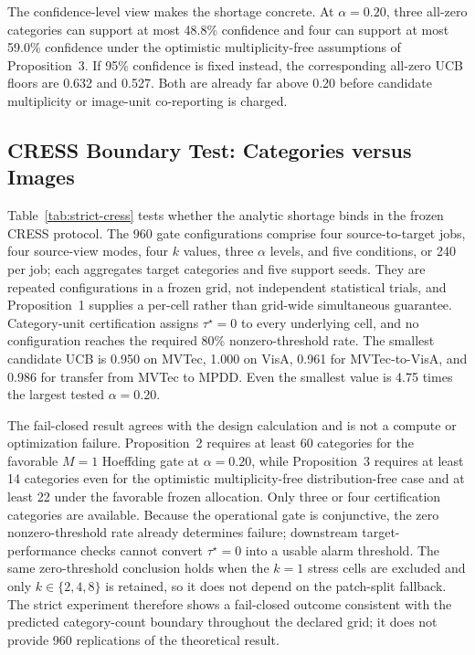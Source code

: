 The confidence-level view makes the shortage concrete. At $\alpha=0.20$, three all-zero categories can support at most 48.8\% confidence and four can support at most 59.0\% confidence under the optimistic multiplicity-free assumptions of Proposition~3. If 95\% confidence is fixed instead, the corresponding all-zero UCB floors are 0.632 and 0.527. Both are already far above 0.20 before candidate multiplicity or image-unit co-reporting is charged.

\subsection{CRESS Boundary Test: Categories versus Images}\label{sec:cress-strict-results}



Table~\ref{tab:strict-cress} tests whether the analytic shortage binds in the frozen CRESS protocol. The 960 gate configurations comprise four source-to-target jobs, four source-view modes, four $k$ values, three $\alpha$ levels, and five conditions, or 240 per job; each aggregates target categories and five support seeds. They are repeated configurations in a frozen grid, not independent statistical trials, and Proposition~1 supplies a per-cell rather than grid-wide simultaneous guarantee. Category-unit certification assigns $\tau^\star=0$ to every underlying cell, and no configuration reaches the required 80\% nonzero-threshold rate. The smallest candidate UCB is 0.950 on MVTec, 1.000 on VisA, 0.961 for MVTec-to-VisA, and 0.986 for transfer from MVTec to MPDD\@. Even the smallest value is 4.75 times the largest tested $\alpha=0.20$.

The fail-closed result agrees with the design calculation and is not a compute or optimization failure. Proposition~2 requires at least 60 categories for the favorable $M=1$ Hoeffding gate at $\alpha=0.20$, while Proposition~3 requires at least 14 categories even for the optimistic multiplicity-free distribution-free case and at least 22 under the favorable frozen allocation. Only three or four certification categories are available. Because the operational gate is conjunctive, the zero nonzero-threshold rate already determines failure; downstream target-performance checks cannot convert $\tau^\star=0$ into a usable alarm threshold. The same zero-threshold conclusion holds when the $k=1$ stress cells are excluded and only $k\in\{2,4,8\}$ is retained, so it does not depend on the patch-split fallback. The strict experiment therefore shows a fail-closed outcome consistent with the predicted category-count boundary throughout the declared grid; it does not provide 960 replications of the theoretical result.

